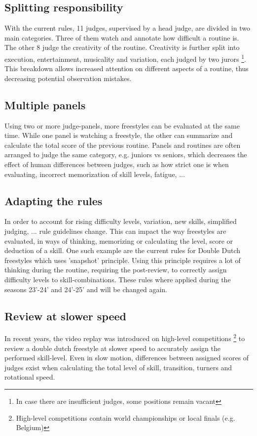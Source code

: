 \subsection{Splitting responsibility}
With the current rules, 11 judges, supervised by a head judge, are divided in two main categories. Three of them watch and annotate how difficult a routine is. The other 8 judge the creativity of the routine. Creativity is further split into execution, entertainment, musicality and variation, each judged by two jurors \footnote{In case there are insufficient judges, some positions remain vacant}. This breakdown allows increased attention on different aspects of a routine, thus decreasing potential observation mistakes.

\subsection{Multiple panels}
Using two or more judge-panels, more freestyles can be evaluated at the same time. While one panel is watching a freestyle, the other can summarize and calculate the total score of the previous routine. Panels and routines are often arranged to judge the same category, e.g. juniors vs seniors, which decreases the effect of human differences between judges, such as how strict one is when evaluating, incorrect memorization of skill levels, fatigue, ...

\subsection{Adapting the rules}
In order to account for rising difficulty levels, variation, new skills, simplified judging, ... rule guidelines change. This can impact the way freestyles are evaluated, in ways of thinking, memorizing or calculating the level, score or deduction of a skill. One such example are the current rules for Double Dutch freestyles which uses 'snapshot' principle. Using this principle requires a lot of thinking during the routine, requiring the post-review, to correctly assign difficulty levels to skill-combinations. These rules where applied during the seasons 23'-24' and 24'-25' and will be changed again.

\subsection{Review at slower speed}
In recent years, the video replay was introduced on high-level competitions \footnote{High-level competitions contain world championships or local finals (e.g. Belgium)} to review a double dutch freestyle at slower speed to accurately assign the performed skill-level.
Even in slow motion, differences between assigned scores of judges exist when calculating the total level of skill, transition, turners and rotational speed.

